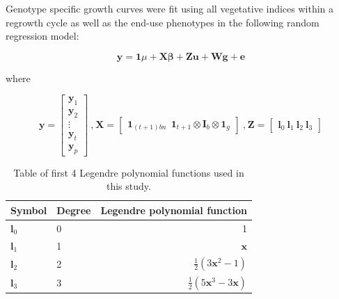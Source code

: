 \documentclass[12pt, letterpaper]{article}
\begin{document}
Genotype specific growth curves were fit using all vegetative indices within a regrowth cycle as well as the end-use phenotypes in the following random regression model:


\begin{equation} \label{rr}
	 \mathbf{y} = \mathbf{1} \mu + \mathbf{X} \boldsymbol{\beta} + \mathbf{Z}\mathbf{u} + \mathbf{W}\mathbf{g} + \mathbf{e} 
\end{equation}

where 

\begin{equation}
 \mathbf{y} = \begin{bmatrix}
    \mathbf{y}_1 \\
    \mathbf{y}_2 \\
    \vdots \\
    \mathbf{y}_t \\
    \mathbf{y}_p
  \end{bmatrix} \ \text{,} \  \mathbf{X} = \begin{bmatrix}
    \mathbf{1}_{(t+1)bn} \ \ \mathbf{1}_{t+1} \otimes \mathbf{I}_{b} \otimes \mathbf{1}_{g}
  \end{bmatrix} \ \text{,} \  \mathbf{Z} = \begin{bmatrix}
    \mathbf{l}_0 \ \mathbf{l}_1 \ \mathbf{l}_2 \ \mathbf{l}_3
  \end{bmatrix}
\end{equation}


\begin{table} 
\caption{Table of first 4 Legendre polynomial functions used in this study.}
\label{tab:abc}
\begin{tabular*}{\hsize}{@{\extracolsep{\fill}}llr}
	 Symbol & Degree & Legendre polynomial function \\ 
	 \hline
	 $\mathbf{l}_0$ & 0 & 1 \\
	 $\mathbf{l}_1$ & 1 & $\mathbf{x}$ \\
	 $\mathbf{l}_2$ & 2 & $\frac{1}{2}(3\mathbf{x}^2 - 1)$ \\
	 $\mathbf{l}_3$ & 3 & $\frac{1}{2}(5\mathbf{x}^3 - 3\mathbf{x})$ \\
	 \hline
\end{tabular*}
\end{table}
\end{document}
